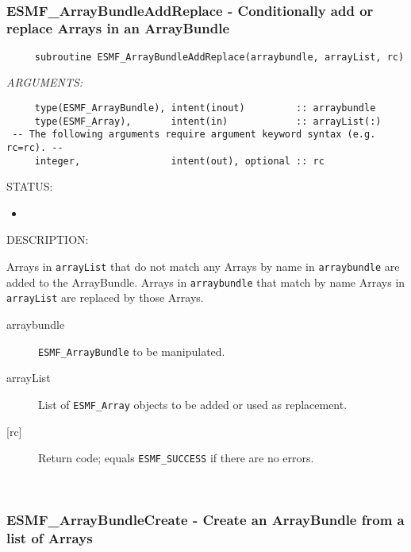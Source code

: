  
\mbox{}\hrulefill\ 
 
\subsubsection [ESMF\_ArrayBundleAddReplace] {ESMF\_ArrayBundleAddReplace - Conditionally add or replace Arrays in an ArrayBundle}


  
\begin{verbatim}     subroutine ESMF_ArrayBundleAddReplace(arraybundle, arrayList, rc)\end{verbatim}{\em ARGUMENTS:}
\begin{verbatim}     type(ESMF_ArrayBundle), intent(inout)         :: arraybundle
     type(ESMF_Array),       intent(in)            :: arrayList(:)
 -- The following arguments require argument keyword syntax (e.g. rc=rc). --
     integer,                intent(out), optional :: rc\end{verbatim}
{\sf STATUS:}
   \begin{itemize}
   \item{}
   \end{itemize}
  
{\sf DESCRIPTION:\\ }


     Arrays in {\tt arrayList} that do not match any Arrays by name in 
     {\tt arraybundle} are added to the ArrayBundle. Arrays in {\tt arraybundle}
     that match by name Arrays in {\tt arrayList} are replaced by those Arrays.
  
     \begin{description}
     \item [arraybundle]
       {\tt ESMF\_ArrayBundle} to be manipulated.
     \item [arrayList]
       List of {\tt ESMF\_Array} objects to be added or used as replacement.
     \item [{[rc]}]
       Return code; equals {\tt ESMF\_SUCCESS} if there are no errors.
     \end{description}
   
 
\mbox{}\hrulefill\ 
 
\subsubsection [ESMF\_ArrayBundleCreate] {ESMF\_ArrayBundleCreate - Create an ArrayBundle from a list of Arrays}



